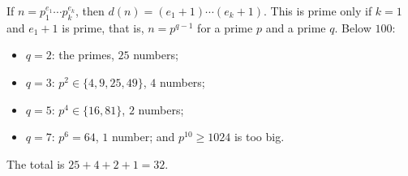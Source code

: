 If $n=p_1^{e_1}\cdots p_k^{e_k}$, then $d(n)=(e_1+1)\cdots(e_k+1)$. This is prime only if $k=1$ and $e_1+1$ is prime, that is, $n=p^{q-1}$ for a prime $p$ and a prime $q$. Below $100$:
\begin{itemize}
\item $q=2$: the primes, $25$ numbers;
\item $q=3$: $p^2\in\{4,9,25,49\}$, $4$ numbers;
\item $q=5$: $p^4\in\{16,81\}$, $2$ numbers;
\item $q=7$: $p^6=64$, $1$ number; and $p^{10}\ge1024$ is too big.
\end{itemize}
The total is $25+4+2+1=\boxed{32}$.
